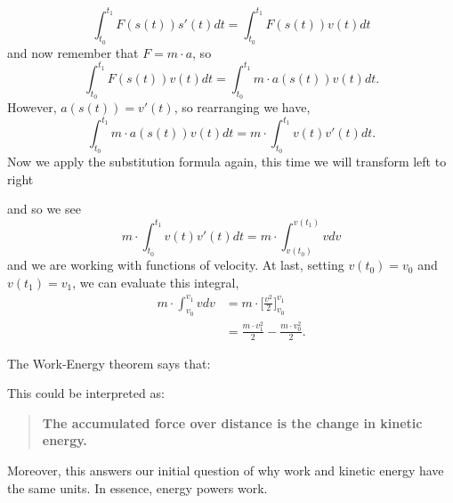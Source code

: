 \documentclass{ximera}
\begin{document}
\begin{theorem}
\begin{explanation}
\[    \int_{t_0}^{t_1} F(s(t)) s'(t) dt = \int_{t_0}^{t_1} F(s(t)) v(t) dt
    \]
    and now remember that $F=m\cdot a$, so
    \[
    \int_{t_0}^{t_1} F(s(t)) v(t) dt = \int_{t_0}^{t_1} m\cdot a(s(t)) v(t) dt.
    \]
    However, $a(s(t)) = v'(t)$, so rearranging we have,
    \[
    \int_{t_0}^{t_1} m\cdot a(s(t)) v(t) dt = m\cdot \int_{t_0}^{t_1} v(t) v'(t) dt.
    \]
    Now we apply the substitution formula again, this time we will transform left to right
    \begin{image}
    \end{image}
    and so we see
    \[
    m\cdot \int_{t_0}^{t_1} v(t) v'(t) dt = m\cdot \int_{v(t_0)}^{v(t_1)} v dv
    \]
    and we are working with functions of velocity.  At last, setting
    $v(t_0) = v_0$ and $v(t_1) = v_1$, we can evaluate this integral,
    \begin{align*}
      m \cdot \int_{v_0}^{v_1} v dv &= m \cdot \bigg[ \frac{v^2}{2} \bigg]_{v_0}^{v_1}\\
      &=\frac{m\cdot v_1^2}{2} - \frac{m\cdot v_0^2}{2}.
    \end{align*}
  \end{explanation}
\end{theorem}

The Work-Energy theorem says that:
\begin{image}
\end{image}
This could be interpreted as:
\begin{quote}
  \large\textbf{The \textcolor{green!70!black!70!blue}{accumulated} \textcolor{purple!50!blue!90!black}{force} \textcolor{green!70!black!70!blue}{over distance} is the \textcolor{blue!70!green}{change in kinetic energy}.}
\end{quote}
Moreover, this answers our initial question of why work and kinetic
energy have the same units.  In essence, energy powers work.
\end{document}
